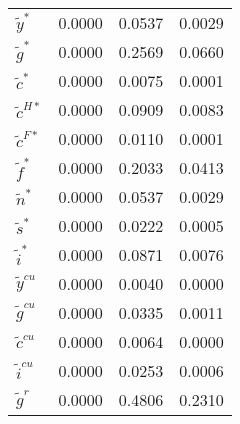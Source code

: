 \begin{center}
\begin{longtable}{lccc}
${\tilde y^*}          $	 & 	       0.0000	 & 	       0.0537	 & 	       0.0029 \\ 
${\tilde g^*}          $	 & 	       0.0000	 & 	       0.2569	 & 	       0.0660 \\ 
${\tilde c^*}          $	 & 	       0.0000	 & 	       0.0075	 & 	       0.0001 \\ 
${\tilde c^{H*}}       $	 & 	       0.0000	 & 	       0.0909	 & 	       0.0083 \\ 
${\tilde c^{F*}}       $	 & 	       0.0000	 & 	       0.0110	 & 	       0.0001 \\ 
${\tilde f^*}          $	 & 	       0.0000	 & 	       0.2033	 & 	       0.0413 \\ 
${\tilde n^*}          $	 & 	       0.0000	 & 	       0.0537	 & 	       0.0029 \\ 
${\tilde s^*}          $	 & 	       0.0000	 & 	       0.0222	 & 	       0.0005 \\ 
${\tilde i^*}          $	 & 	       0.0000	 & 	       0.0871	 & 	       0.0076 \\ 
${\tilde y^{cu}}       $	 & 	       0.0000	 & 	       0.0040	 & 	       0.0000 \\ 
${\tilde g^{cu}}       $	 & 	       0.0000	 & 	       0.0335	 & 	       0.0011 \\ 
${\tilde c^{cu}}       $	 & 	       0.0000	 & 	       0.0064	 & 	       0.0000 \\ 
${\tilde i^{cu}}       $	 & 	       0.0000	 & 	       0.0253	 & 	       0.0006 \\ 
${\tilde g^{r}}        $	 & 	       0.0000	 & 	       0.4806	 & 	       0.2310 \\ 
\end{longtable}
 \end{center}
